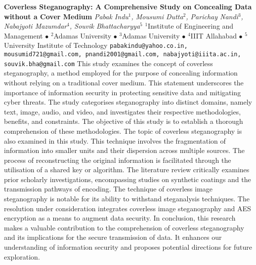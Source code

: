 
    \begin{conf-abstract}[]
        {\textbf{Coverless Steganography: A Comprehensive Study on Concealing Data without a Cover Medium}}
        {\textit{Pabak Indu$^{1}$, Mousumi Dutta$^{2}$, Parichay Nandi$^{3}$, Nabajyoti Mazumdar$^{4}$, Souvik Bhattacharyya$^{5}$}}
        {$^{1}$Institute of Engineering and Management $\bullet$ $^{2}$Adamas University $\bullet$ $^{3}$Adamas University $\bullet$ $^{4}$IIIT Allahabad $\bullet$ $^{5}$University Institute of Technology}
        {\texttt{pabakindu@yahoo.co.in, mousumid721@gmail.com, pnandi2001@gmail.com, nabajyoti@iiita.ac.in, souvik.bha@gmail.com}}
        {This study examines the concept of coverless steganography, a method employed for the purpose of concealing information without relying on a traditional cover medium. This statement underscores the importance of information security in protecting sensitive data and mitigating cyber threats. The study categorises steganography into distinct domains, namely text, image, audio, and video, and investigates their respective methodologies, benefits, and constraints. The objective of this study is to establish a thorough comprehension of these methodologies. The topic of coverless steganography is also examined in this study. This technique involves the fragmentation of information into smaller units and their dispersion across multiple sources. The process of reconstructing the original information is facilitated through the utilisation of a shared key or algorithm. The literature review critically examines prior scholarly investigations, encompassing studies on synthetic coatings and the transmission pathways of encoding. The technique of coverless image steganography is notable for its ability to withstand steganalysis techniques. The resolution under consideration integrates coverless image steganography and AES encryption as a means to augment data security.  In conclusion, this research makes a valuable contribution to the comprehension of coverless steganography and its implications for the secure transmission of data. It enhances our understanding of information security and proposes potential directions for future exploration.}
    \end{conf-abstract}
        